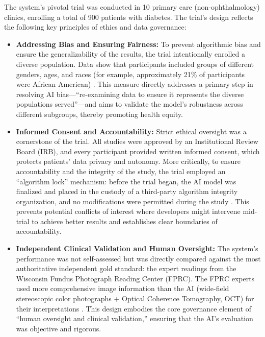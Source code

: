 \documentclass[sigplan,screen]{acmart}
\begin{document}
The system's pivotal trial \cite{abramoff2018pivotal} was conducted in 10 primary care (non-ophthalmology) clinics, enrolling a total of 900 patients with diabetes. The trial's design reflects the following key principles of ethics and data governance:

\begin{itemize}
\item \textbf{Addressing Bias and Ensuring Fairness:} To prevent algorithmic bias and ensure the generalizability of the results, the trial intentionally enrolled a diverse population. Data show that participants included groups of different genders, ages, and races (for example, approximately 21\% of participants were African American) \cite{abramoff2018pivotal}. This measure directly addresses a primary step in resolving AI bias---``re-examining data to ensure it represents the diverse populations served''---and aims to validate the model's robustness across different subgroups, thereby promoting health equity.

\item \textbf{Informed Consent and Accountability:} Strict ethical oversight was a cornerstone of the trial. All studies were approved by an Institutional Review Board (IRB), and every participant provided written informed consent, which protects patients' data privacy and autonomy. More critically, to ensure accountability and the integrity of the study, the trial employed an ``algorithm lock'' mechanism: before the trial began, the AI model was finalized and placed in the custody of a third-party algorithm integrity organization, and no modifications were permitted during the study \cite{fda2018denovo_summary}. This prevents potential conflicts of interest where developers might intervene mid-trial to achieve better results and establishes clear boundaries of accountability.

\item \textbf{Independent Clinical Validation and Human Oversight:} The system's performance was not self-assessed but was directly compared against the most authoritative independent gold standard: the expert readings from the Wisconsin Fundus Photograph Reading Center (FPRC). The FPRC experts used more comprehensive image information than the AI (wide-field stereoscopic color photographs + Optical Coherence Tomography, OCT) for their interpretations \cite{abramoff2018pivotal}. This design embodies the core governance element of ``human oversight and clinical validation,'' ensuring that the AI's evaluation was objective and rigorous.
    \end{itemize}
\end{document}
